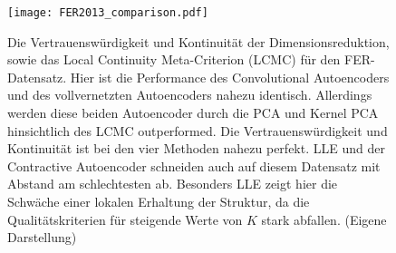 \begin{figure}[ht]
	\begin{center}
		\texttt{[image: FER2013\_comparison.pdf]}
	\end{center}
	\caption[Qualitätskriterien für den FER-Datensatz]{Die Vertrauenswürdigkeit und Kontinuität der Dimensionsreduktion, sowie das Local Continuity Meta-Criterion (LCMC) für den FER-Datensatz. Hier ist die Performance des Convolutional Autoencoders und des vollvernetzten Autoencoders nahezu identisch. Allerdings werden diese beiden Autoencoder durch die PCA und Kernel PCA hinsichtlich des LCMC outperformed. Die Vertrauenswürdigkeit und Kontinuität ist bei den vier Methoden nahezu perfekt. LLE und der Contractive Autoencoder schneiden auch auf diesem Datensatz mit Abstand am schlechtesten ab. Besonders LLE zeigt hier die Schwäche einer lokalen Erhaltung der Struktur, da die Qualitätskriterien für steigende Werte von $K$ stark abfallen. (Eigene Darstellung)}
	\label{fig:FER2013Metrics}
\end{figure}


